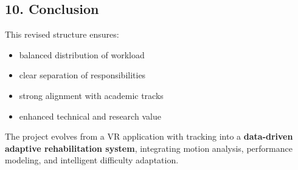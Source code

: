 \documentclass[11pt]{article}
\begin{document}
\subsection*{10. Conclusion}


This revised structure ensures:


\begin{itemize}
\item balanced distribution of workload
\item clear separation of responsibilities
\item strong alignment with academic tracks
\item enhanced technical and research value
\end{itemize}

The project evolves from a VR application with tracking into a \textbf{data-driven adaptive rehabilitation system}, integrating motion analysis, performance modeling, and intelligent difficulty adaptation.
\end{document}

